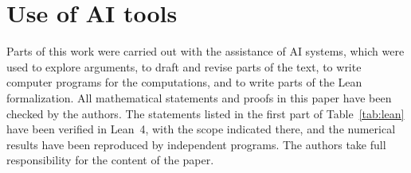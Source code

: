 \section*{Use of AI tools}
Parts of this work were carried out with the assistance of AI systems,
which were used to explore arguments, to draft and revise parts of the
text, to write computer programs for the computations, and to write
parts of the Lean formalization. All mathematical statements and proofs
in this paper have been checked by the authors. The statements listed in
the first part of Table~\ref{tab:lean} have been verified in Lean~4,
with the scope indicated there, and the numerical
results have been reproduced by independent programs. The authors take
full responsibility for the content of the paper.

